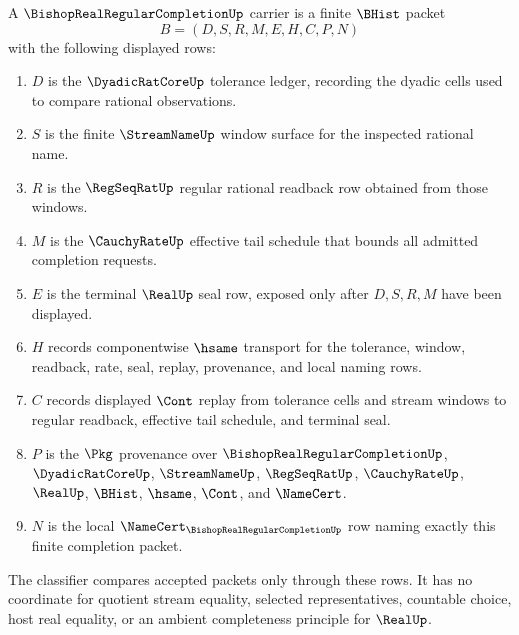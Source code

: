 \begin{definition}
\label{def:bishop-real-regular-completion-carrier}
A $\BishopRealRegularCompletionUp$ carrier is a finite $\BHist$ packet
$$
B=(D,S,R,M,E,H,C,P,N)
$$
with the following displayed rows:
\begin{enumerate}
\item $D$ is the $\DyadicRatCoreUp$ tolerance ledger, recording the dyadic cells used to compare rational observations.
\item $S$ is the finite $\StreamNameUp$ window surface for the inspected rational name.
\item $R$ is the $\RegSeqRatUp$ regular rational readback row obtained from those windows.
\item $M$ is the $\CauchyRateUp$ effective tail schedule that bounds all admitted completion requests.
\item $E$ is the terminal $\RealUp$ seal row, exposed only after $D,S,R,M$ have been displayed.
\item $H$ records componentwise $\hsame$ transport for the tolerance, window, readback, rate, seal, replay, provenance, and local naming rows.
\item $C$ records displayed $\Cont$ replay from tolerance cells and stream windows to regular readback, effective tail schedule, and terminal seal.
\item $P$ is the $\Pkg$ provenance over $\BishopRealRegularCompletionUp$, $\DyadicRatCoreUp$, $\StreamNameUp$, $\RegSeqRatUp$, $\CauchyRateUp$, $\RealUp$, $\BHist$, $\hsame$, $\Cont$, and $\NameCert$.
\item $N$ is the local $\NameCert_{\BishopRealRegularCompletionUp}$ row naming exactly this finite completion packet.
\end{enumerate}
The classifier compares accepted packets only through these rows. It has no coordinate for quotient stream equality, selected representatives, countable choice, host real equality, or an ambient completeness principle for $\RealUp$.
\end{definition}

